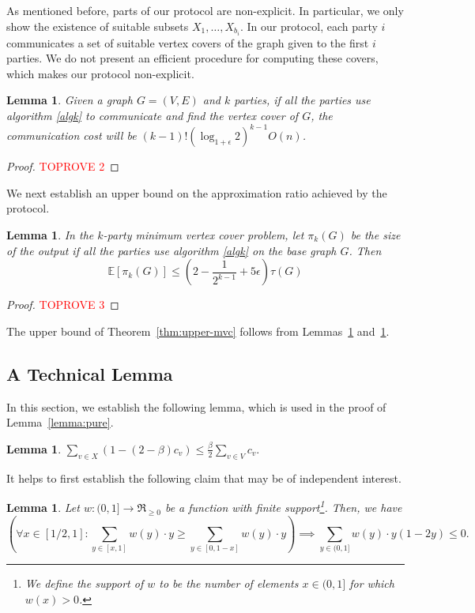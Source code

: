 \documentclass[11pt]{article}
\newtheorem{lemma}[theorem]{Lemma}
\newcommand{\E}[0]{\ensuremath{\mathbb{E}}}
\newcommand{\mvc}[1]{\tau\left(#1 \right)}
\begin{document}
As mentioned before, parts of our protocol are non-explicit. In particular, we only show the existence of suitable subsets $X_1, \dots, X_{b_i}$.  In our protocol, each party $i$ communicates a set of suitable vertex covers of the graph given to the first $i$ parties. We do not present an efficient procedure for computing these covers, which makes our protocol non-explicit.

\begin{lemma}
  \label{lemma:communication}
Given a graph $G = (V, E)$ and $k$ parties, if all the parties use algorithm \ref{algk} to communicate and find the vertex cover of $G$, the communication cost will be 
$(k-1)! (\log_{1 + \epsilon}2)^{k-1} O(n)$.
\end{lemma}

\begin{proof}\textcolor{red}{TOPROVE 2}\end{proof}

We next establish an upper bound on the approximation
ratio achieved by the protocol.

\begin{lemma}
\label{lemma:approximation}
  In the $k$-party minimum vertex cover problem, 
let $\pi_{k}(G)$ be the size of the output if all the parties use algorithm \ref{algk} on the base graph $G$.
     Then \[\E [\pi_k(G) ] \leq (2 - \frac{1}{2^{k-1}} + 5 \epsilon) \mvc{G}\]
\end{lemma}
\begin{proof}\textcolor{red}{TOPROVE 3}\end{proof}

The upper bound of Theorem~\ref{thm:upper-mvc} follows from
Lemmas~\ref{lemma:communication} and~\ref{lemma:approximation}.



\subsection{A Technical Lemma}
\label{sec:technical}
In this section, we establish the following lemma, which is used in
the proof of Lemma~\ref{lemma:pure}.
\begin{lemma}
  \label{claim:vertex cover weight}
$\sum_{v\in X} (1- (2-\beta) c_v)\leq \frac{\beta}{2}\sum_{v\in V} c_v.$
\end{lemma}
It helps to first establish the following claim that may be of independent interest.  
\begin{lemma}
  \label{lem:middle region}
Let $w: (0,1] \rightarrow \Re_{\ge 0}$ be a function with finite
  support\footnote{We define the support of $w$ to be the number of
    elements $x \in (0,1]$ for which $w(x) > 0$.}.  Then, we have
\[
\left(\forall x \in [1/2, 1]: \sum_{y \in [x,1]} w(y) \cdot y \ge \sum_{y \in [0,1-x]} w(y) \cdot y\right) \implies
\sum_{y \in (0,1]} w(y) \cdot y (1 - 2y) \le 0.
\]
\end{lemma}
\end{document}
